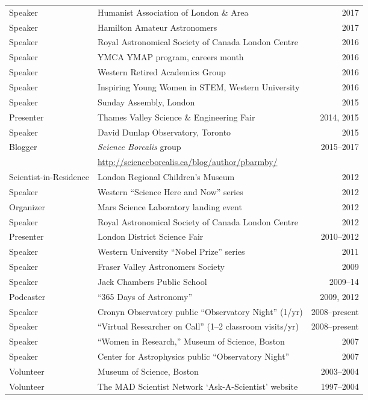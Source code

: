 \begin{tabularx}{\textwidth}{lXr}
Speaker & Humanist Association of London \& Area & 2017\\
Speaker & Hamilton Amateur Astronomers & 2017\\
Speaker& Royal Astronomical Society of Canada London Centre& 2016\\
Speaker & YMCA YMAP program, careers month & 2016\\
Speaker& Western Retired Academics Group& 2016\\
Speaker &  Inspiring Young Women in STEM, Western University & 2016\\
Speaker & Sunday Assembly, London  & 2015\\
Presenter& Thames Valley Science \& Engineering Fair& 2014, 2015\\
Speaker & David Dunlap Observatory, Toronto& 2015\\
Blogger & {\it Science Borealis} group& 2015--2017\\
&  \url{http://scienceborealis.ca/blog/author/pbarmby/}  & \\
Scientist-in-Residence& London Regional Children's Museum& 2012\\
Speaker& Western ``Science Here and Now'' series& 2012\\
Organizer& Mars Science Laboratory landing event& 2012\\
Speaker& Royal Astronomical Society of Canada London Centre& 2012\\
Presenter& London District Science Fair& 2010--2012\\
Speaker& Western University ``Nobel Prize'' series& 2011\\
Speaker& Fraser Valley Astronomers Society& 2009\\
Speaker& Jack Chambers Public School& 2009--14\\
Podcaster &  ``365 Days of Astronomy''  &2009, 2012\\
Speaker& Cronyn Observatory public ``Observatory Night'' (1/yr)& 2008--present\\
Speaker& ``Virtual Researcher on Call''  (1--2 classroom visits/yr) & 2008--present\\
Speaker & ``Women in Research,''  Museum of Science, Boston& 2007\\
Speaker& Center for Astrophysics public ``Observatory Night'' & 2007\\
Volunteer& Museum of Science, Boston& 2003--2004\\
Volunteer& The MAD Scientist Network `Ask-A-Scientist' website& 1997--2004\\
\end{tabularx}
